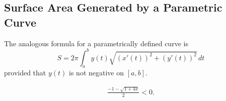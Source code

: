 \documentclass{report}
\begin{document}
    \pagebreak 
    \subsection{Surface Area Generated by a Parametric Curve}
    \bigbreak \noindent 
    \begin{thrmm}
        The analogous formula for a parametrically defined curve is
        \[
            S = 2\pi \int_{a}^{b} y(t) \sqrt{(x'(t))^2 + (y'(t))^2} \, dt
        \]
        provided that \( y(t) \) is not negative on \([a, b]\).
    \end{thrmm}

    \begin{align*}
        \frac{-1-\sqrt{1+4x}}{2} < 0 
    .\end{align*}
    



    


    
    

    


    








    
    


    

    
    





    
\end{document}
